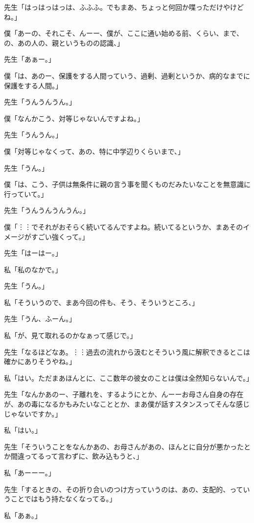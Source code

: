 \documentclass[b5j,twoside,twocolumn]{utarticle}
\begin{document}
\begin{description}
\item 先生「はっはっはっは、ふふふ。でもまあ、ちょっと何回か喋っただけやけどね。」
\item 僕「あーの、それこそ、んーー、僕が、ここに通い始める前、くらい、まで、の、あの人の、親というものの認識、」
\item 先生「あぁー。」
\item 僕「は、あのー、保護をする人間っていう、過剰、過剰というか、病的なまでに保護をする人間。」
\item 先生「うんうんうん。」
\item 僕「なんかこう、対等じゃないんですよね。」
\item 先生「うんうん。」
\item 僕「対等じゃなくって、あの、特に中学辺りくらいまで、」
\item 先生「うん。」
\item 僕「は、こう、子供は無条件に親の言う事を聞くものだみたいなことを無意識に行っていて。」
\item 先生「うんうんうんうん。」
\item 僕「︙︙でそれがおそらく続いてるんですよね。続いてるというか、まあそのイメージがすごい強くって。」
\item 先生「はーはー。」
\item 私「私のなかで。」
\item 先生「うん。」
\item 私「そういうので、まあ今回の件も、そう、そういうところ、」
\item 先生「うん、ふーん。」
\item 私「が、見て取れるのかなぁって感じで。」
\item 先生「なるほどなあ。︙︙過去の流れから汲むとそういう風に解釈できるとこは確かにありそうやね。」
\item 私「はい。ただまあほんとに、ここ数年の彼女のことは僕は全然知らないんで。」
\item 先生「なんかあのー、子離れを、するようにとか、んーーお母さん自身の存在が、あの毒になるかもみたいなこととか、まあ僕が話すスタンスってそんな感じじゃないですか。」
\item 私「はい。」
\item 先生「そういうことをなんかあの、お母さんがあの、ほんとに自分が悪かったとか間違ってるって言わずに、飲み込もうと、」
\item 私「あーーー。」
\item 先生「するときの、その折り合いのつけ方っていうのは、あの、支配的、っていうことではもう持たなくなってる。」
\item 私「あぁ。」

\end{description}
\end{document}
